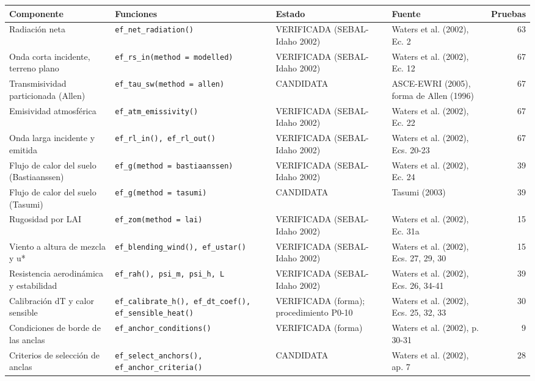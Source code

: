 \begin{tabularx}{\textwidth}{>{\raggedright\arraybackslash}p{3.4cm}>{\raggedright\arraybackslash}X>{\raggedright\arraybackslash}p{2.9cm}>{\raggedright\arraybackslash}p{3.1cm}r}
\toprule
Componente & Funciones & Estado & Fuente & Pruebas \\
\midrule
Radiación neta & \texttt{ef\_net\_radiation()} & VERIFICADA (SEBAL-Idaho 2002) & Waters et al. (2002), Ec. 2 & 63 \\
Onda corta incidente, terreno plano & \texttt{ef\_rs\_in(method = modelled)} & VERIFICADA (SEBAL-Idaho 2002) & Waters et al. (2002), Ec. 12 & 67 \\
Transmisividad particionada (Allen) & \texttt{ef\_tau\_sw(method = allen)} & CANDIDATA & ASCE-EWRI (2005), forma de Allen (1996) & 67 \\
Emisividad atmosférica & \texttt{ef\_atm\_emissivity()} & VERIFICADA (SEBAL-Idaho 2002) & Waters et al. (2002), Ec. 22 & 67 \\
Onda larga incidente y emitida & \texttt{ef\_rl\_in(), ef\_rl\_out()} & VERIFICADA (SEBAL-Idaho 2002) & Waters et al. (2002), Ecs. 20-23 & 67 \\
Flujo de calor del suelo (Bastiaanssen) & \texttt{ef\_g(method = bastiaanssen)} & VERIFICADA (SEBAL-Idaho 2002) & Waters et al. (2002), Ec. 24 & 39 \\
Flujo de calor del suelo (Tasumi) & \texttt{ef\_g(method = tasumi)} & CANDIDATA & Tasumi (2003) & 39 \\
Rugosidad por LAI & \texttt{ef\_zom(method = lai)} & VERIFICADA (SEBAL-Idaho 2002) & Waters et al. (2002), Ec. 31a & 15 \\
Viento a altura de mezcla y u* & \texttt{ef\_blending\_wind(), ef\_ustar()} & VERIFICADA (SEBAL-Idaho 2002) & Waters et al. (2002), Ecs. 27, 29, 30 & 15 \\
Resistencia aerodinámica y estabilidad & \texttt{ef\_rah(), psi\_m, psi\_h, L} & VERIFICADA (SEBAL-Idaho 2002) & Waters et al. (2002), Ecs. 26, 34-41 & 39 \\
Calibración dT y calor sensible & \texttt{ef\_calibrate\_h(), ef\_dt\_coef(), ef\_sensible\_heat()} & VERIFICADA (forma); procedimiento P0-10 & Waters et al. (2002), Ecs. 25, 32, 33 & 30 \\
Condiciones de borde de las anclas & \texttt{ef\_anchor\_conditions()} & VERIFICADA (forma) & Waters et al. (2002), p. 30-31 & 9 \\
Criterios de selección de anclas & \texttt{ef\_select\_anchors(), ef\_anchor\_criteria()} & CANDIDATA & Waters et al. (2002), ap. 7 & 28 \\

\end{tabularx}
